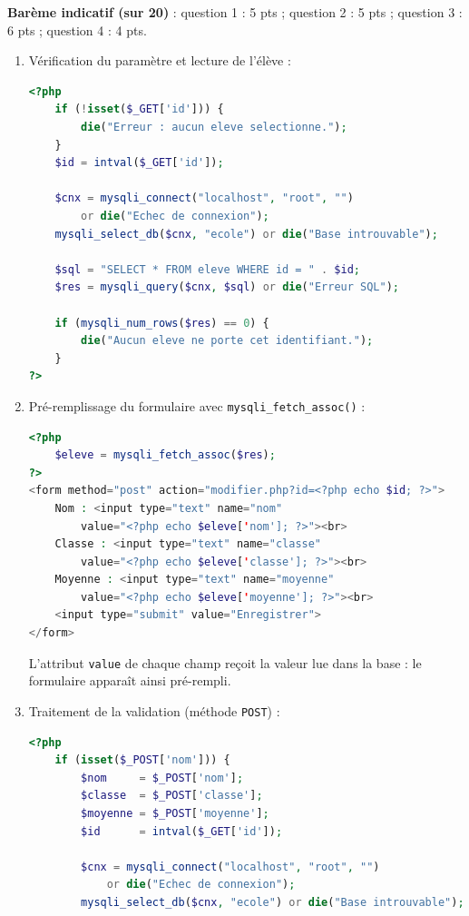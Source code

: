 \documentclass[11pt]{article}
\begin{document}
\begin{corrige}
\textbf{Barème indicatif (sur 20)} : question 1 : 5 pts ; question 2 : 5 pts ; question 3 : 6 pts ; question 4 : 4 pts.

\begin{enumerate}
\item Vérification du paramètre et lecture de l'élève :
\begin{lstlisting}[language=Php]
<?php
    if (!isset($_GET['id'])) {
        die("Erreur : aucun eleve selectionne.");
    }
    $id = intval($_GET['id']);

    $cnx = mysqli_connect("localhost", "root", "")
        or die("Echec de connexion");
    mysqli_select_db($cnx, "ecole") or die("Base introuvable");

    $sql = "SELECT * FROM eleve WHERE id = " . $id;
    $res = mysqli_query($cnx, $sql) or die("Erreur SQL");

    if (mysqli_num_rows($res) == 0) {
        die("Aucun eleve ne porte cet identifiant.");
    }
?>
\end{lstlisting}
\item Pré-remplissage du formulaire avec \texttt{mysqli\_fetch\_assoc()} :
\begin{lstlisting}[language=Php]
<?php
    $eleve = mysqli_fetch_assoc($res);
?>
<form method="post" action="modifier.php?id=<?php echo $id; ?>">
    Nom : <input type="text" name="nom"
        value="<?php echo $eleve['nom']; ?>"><br>
    Classe : <input type="text" name="classe"
        value="<?php echo $eleve['classe']; ?>"><br>
    Moyenne : <input type="text" name="moyenne"
        value="<?php echo $eleve['moyenne']; ?>"><br>
    <input type="submit" value="Enregistrer">
</form>
\end{lstlisting}
L'attribut \texttt{value} de chaque champ reçoit la valeur lue dans la base : le formulaire apparaît ainsi pré-rempli.
\item Traitement de la validation (méthode \texttt{POST}) :
\begin{lstlisting}[language=Php]
<?php
    if (isset($_POST['nom'])) {
        $nom     = $_POST['nom'];
        $classe  = $_POST['classe'];
        $moyenne = $_POST['moyenne'];
        $id      = intval($_GET['id']);

        $cnx = mysqli_connect("localhost", "root", "")
            or die("Echec de connexion");
        mysqli_select_db($cnx, "ecole") or die("Base introuvable");


\end{lstlisting}
\end{enumerate}
\end{corrige}
\end{document}
